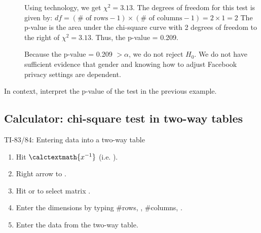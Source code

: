 \begin{examplewrap}
\begin{nexample}
\begin{description}
\item[]  Using technology, we get $\chi^2 = 3.13$.  The degrees of freedom for this test is given by: $df = (\# \text{ of rows} - 1) \times (\# \text{ of columns} - 1) = 2\times 1 = 2$
\newline  The p-value is the area under the chi-square curve with 2 degrees of freedom to the right of $\chi^2=3.13$.  Thus, the p-value = 0.209.
\item[]  Because the p-value = 0.209 $ > \alpha$, we do not reject $H_0$. We do not have sufficient evidence that gender and knowing how to adjust Facebook privacy settings are dependent.
\end{description}
\end{nexample}
\end{examplewrap}

\begin{exercisewrap}
\begin{nexercise}
In context, interpret the p-value of the test in the previous example.\footnotemark
\end{nexercise}
\end{exercisewrap}


\D{\newpage}

\subsection{Calculator: chi-square test in two-way tables}
\label{calcchisq2way}

\begin{onebox}{ TI-83/84: Entering data into a two-way table}
\label{2waytable}
\begin{enumerate}
\setlength{\itemsep}{0mm}
\item Hit  $\calctextmath{x^{-1}}$ (i.e. ).
\item Right arrow to .
\item Hit  or  to select matrix .
\item Enter the dimensions by typing \#rows, , \#columns, .
\item Enter the data from the two-way table.
\end{enumerate}
\end{onebox}


